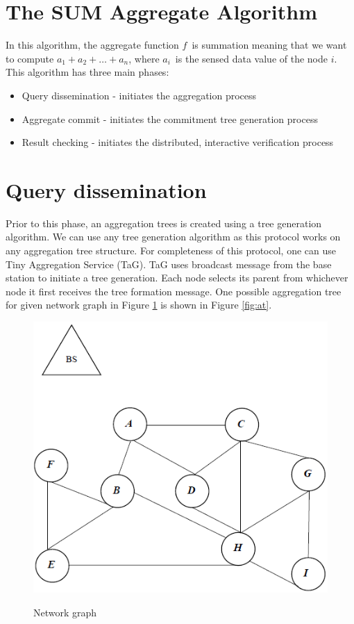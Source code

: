 \section{The SUM Aggregate Algorithm}
		In this algorithm, the aggregate function $f$\ is summation meaning that we want to compute $a_{1} + a_{2} + \dotsc + a_{n}$, where $a_{i}$\ is the sensed data value of the node $i$.
		This algorithm has three main phases:
		\begin{itemize}
			\item Query dissemination - initiates the aggregation process
			\item Aggregate commit - initiates the commitment tree generation process
			\item Result checking - initiates the distributed, interactive verification process
		\end{itemize}

\section{Query dissemination}
		\label{sec:query-dissemination}
		Prior to this phase, an aggregation trees is created using a tree generation algorithm.
		We can use any tree generation algorithm as this protocol works on any aggregation tree structure.
		For completeness of this protocol, one can use Tiny Aggregation Service (TaG)\cite{madden2002tag}.
		TaG uses broadcast message from the base station to initiate a tree generation.
		Each node selects its parent from whichever node it first receives the tree formation message.
		One possible aggregation tree for given network graph in Figure \ref{fig:ng} is shown in Figure \ref{fig:at}. 
		\begin{figure}[h!]
			\centering
			\includegraphics[scale = 1]{images/network-graph.png}\\
			\caption{Network graph}
			\label{fig:ng}
		\end{figure}
		
